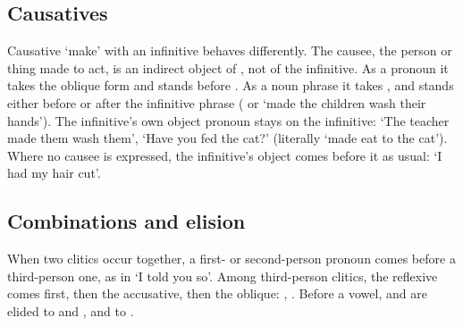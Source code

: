 \subsection{Causatives}\label{sec:causative-pronouns}
Causative  `make' with an infinitive behaves differently. The causee, the person or thing made to act, is an indirect object of , not of the infinitive. As a pronoun it takes the oblique form and stands before . As a noun phrase it takes , and stands either before or after the infinitive phrase ( or  `made the children wash their hands'). The infinitive's own object pronoun stays on the infinitive:  `The teacher made them wash them',  `Have you fed the cat?' (literally `made eat to the cat'). Where no causee is expressed, the infinitive's object comes before it as usual:  `I had my hair cut'.

\subsection{Combinations and elision}
When two clitics occur together, a first- or second-person pronoun comes before a third-person one, as in  `I told you so'. Among third-person clitics, the reflexive  comes first, then the accusative, then the oblique: , . Before a vowel,  and  are elided to  and , and  to .

